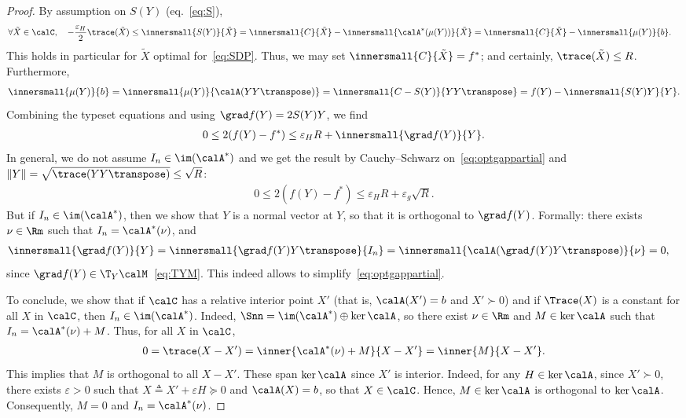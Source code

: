 \documentclass{article}
\newcommand{\1}{\mathbf{1}}
\begin{document}
\begin{proof}
	By assumption on $S(Y)$ (eq.~\eqref{eq:S}),
	\begin{align*}
	\forall \tilde X\in\calC, \quad -\frac{\varepsilon_H}{2} \trace(\tilde X) \leq \innersmall{S(Y)}{\tilde X} & = \innersmall{C}{\tilde X} - \innersmall{\calA^*(\mu(Y))}{\tilde X} = \innersmall{C}{\tilde X} - \innersmall{\mu(Y)}{b}.
	\end{align*}
	This holds in particular for $\tilde X$ optimal for~\eqref{eq:SDP}. Thus, we may set $\innersmall{C}{\tilde X} = f^*$; and certainly, $\trace(\tilde X) \leq R$. Furthermore,
	\begin{align*}
	\innersmall{\mu(Y)}{b} = \innersmall{\mu(Y)}{\calA(YY\transpose)} = \innersmall{C-S(Y)}{YY\transpose} = f(Y) - \innersmall{S(Y)Y}{Y}.
	\end{align*}
	Combining the typeset equations and using $\grad f(Y) = 2S(Y)Y$, we find
	\begin{align}
	0 \leq 2(f(Y) - f^*) \leq \varepsilon_H R + \innersmall{\grad f(Y)}{Y}.
	\label{eq:optgappartial}
	\end{align}
	In general, we do not assume $I_n \in \im(\calA^*)$ and we get the result by Cauchy--Schwarz on~\eqref{eq:optgappartial} and $\|Y\| = \sqrt{\trace(YY\transpose)} \leq \sqrt{R}$:
	\begin{align*}
	0 \leq 2(f(Y)-f^*) \leq \varepsilon_H R + \varepsilon_g \sqrt{R}.
	\end{align*}
	But if $I_n \in \im(\calA^*)$, then we show that $Y$ is a normal vector at $Y$, so that it is orthogonal to $\grad f(Y)$. Formally: there exists $\nu \in \Rm$ such that $I_n = \calA^*(\nu)$, and
	\begin{align*}
	\innersmall{\grad f(Y)}{Y} & = \innersmall{\grad f(Y) Y\transpose}{I_n} = \innersmall{\calA(\grad f(Y) Y\transpose)}{\nu} = 0,
	\end{align*}
	since $\grad f(Y) \in \T_Y\calM$~\eqref{eq:TYM}. This indeed allows to simplify~\eqref{eq:optgappartial}.
	
	To conclude, we show that if $\calC$ has a relative interior point $X'$ (that is, $\calA(X') = b$ and $X' \succ 0$) and if $\Trace(X)$ is a constant for all $X$ in $\calC$, then $I_n \in \im(\calA^*)$. Indeed, $\Snn = \im(\calA^*) \oplus \ker\calA$, so there exist $\nu\in\Rm$ and $M \in \ker \calA$ such that $I_n = \calA^*(\nu) + M$. Thus, for all $X$ in $\calC$,
	\begin{align*}
	0 = \trace(X - X') = \inner{\calA^*(\nu)+M}{X-X'} = \inner{M}{X-X'}.
	\end{align*}
	This implies that $M$ is orthogonal to all $X-X'$. These span $\ker\calA$ since $X'$ is interior. Indeed, for any $H\in\ker\calA$, since $X'\succ 0$, there exists $\varepsilon > 0$ such that $X \triangleq X'+\varepsilon H \succeq 0$ and $\calA(X) = b$, so that $X \in \calC$.
	Hence, $M \in \ker\calA$ is orthogonal to $\ker \calA$. Consequently, $M = 0$ and $I_n = \calA^*(\nu)$.
\end{proof}
\end{document}
